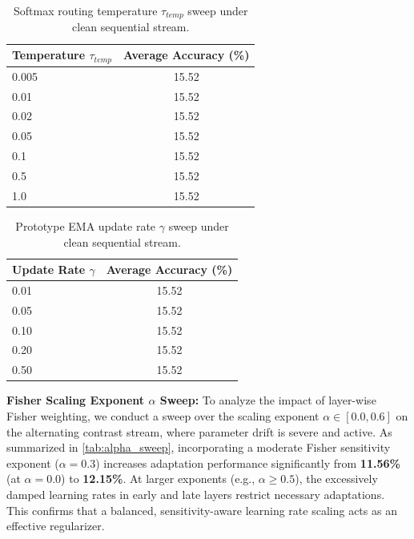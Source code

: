\documentclass{article}
\theoremstyle{plain}
\theoremstyle{definition}
\theoremstyle{remark}
\begin{document}
\begin{table}[h]
\caption{Softmax routing temperature $\tau_{temp}$ sweep under clean sequential stream.}
\label{tab:temp_sweep}
\begin{center}
\begin{small}
\begin{tabular}{lc}
\toprule
Temperature $\tau_{temp}$ & Average Accuracy (\%) \\
\midrule
0.005 & 15.52 \\
0.01  & 15.52 \\
0.02  & 15.52 \\
0.05  & 15.52 \\
0.1   & 15.52 \\
0.5   & 15.52 \\
1.0   & 15.52 \\
\bottomrule
\end{tabular}
\end{small}
\end{center}
\end{table}

\begin{table}[h]
\caption{Prototype EMA update rate $\gamma$ sweep under clean sequential stream.}
\label{tab:gamma_sweep}
\begin{center}
\begin{small}
\begin{tabular}{lc}
\toprule
Update Rate $\gamma$ & Average Accuracy (\%) \\
\midrule
0.01 & 15.52 \\
0.05 & 15.52 \\
0.10 & 15.52 \\
0.20 & 15.52 \\
0.50 & 15.52 \\
\bottomrule
\end{tabular}
\end{small}
\end{center}
\end{table}

\textbf{Fisher Scaling Exponent $\alpha$ Sweep:} To analyze the impact of layer-wise Fisher weighting, we conduct a sweep over the scaling exponent $\alpha \in [0.0, 0.6]$ on the alternating contrast stream, where parameter drift is severe and active. As summarized in \cref{tab:alpha_sweep}, incorporating a moderate Fisher sensitivity exponent ($\alpha = 0.3$) increases adaptation performance significantly from \textbf{11.56\%} (at $\alpha = 0.0$) to \textbf{12.15\%}. At larger exponents (e.g., $\alpha \ge 0.5$), the excessively damped learning rates in early and late layers restrict necessary adaptations. This confirms that a balanced, sensitivity-aware learning rate scaling acts as an effective regularizer.
\end{document}
